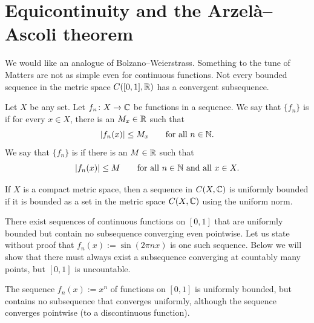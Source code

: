 
\sectionnewpage
\section{Equicontinuity and the Arzel\`a--Ascoli theorem}
\label{sec:arzelaascoli}


We would like an analogue of Bolzano--Weierstrass.  Something to the tune of
Matters are not
as simple even for continuous functions. 
Not every bounded sequence in the metric space $C([0,1],{\mathbb{R}})$ has
a convergent subsequence.

\begin{defn}
Let $X$ be any set.
Let $f_n \colon X \to {\mathbb{C}}$ be functions in a sequence.  We say that
$\{ f_n \}$
is \emph{} if for every $x \in X$, there is an $M_x \in {\mathbb{R}}$
such that
\begin{equation*}
\lvert {f_n(x)} \rvert \leq M_x \qquad \text{for all } n \in {\mathbb{N}} .
\end{equation*}
We say that
$\{ f_n \}$
is \emph{} if there is an $M \in {\mathbb{R}}$
such that
\begin{equation*}
\lvert {f_n(x)} \rvert \leq M \qquad \text{for all } n \in {\mathbb{N}} \text{ and all } x \in X.
\end{equation*}
\end{defn}

If $X$ is a compact metric space, then a sequence in $C(X,{\mathbb{C}})$
is uniformly bounded if it is bounded as a set in the metric space
$C(X,{\mathbb{C}})$ using the uniform norm.

\begin{example}
There exist sequences of 
continuous functions
on $[0,1]$ that are uniformly bounded but contain no subsequence converging
even pointwise.
Let us state without proof that $f_n(x) := \sin (2\pi n x)$ is one
such sequence.
Below we will show that there must always exist
a subsequence converging at countably
many points, but $[0,1]$ is uncountable.
\end{example}

\begin{example}
The sequence $f_n(x) := x^n$ of functions on $[0,1]$
is uniformly bounded, but contains no subsequence that converges
uniformly,
although the sequence converges pointwise (to a discontinuous function).
\end{example}

